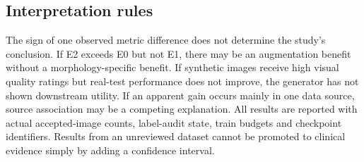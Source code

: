 \subsection{Interpretation rules}
The sign of one observed metric difference does not determine the study's conclusion. If E2 exceeds E0 but not E1, there may be an augmentation benefit without a morphology-specific benefit. If synthetic images receive high visual quality ratings but real-test performance does not improve, the generator has not shown downstream utility. If an apparent gain occurs mainly in one data source, source association may be a competing explanation. All results are reported with actual accepted-image counts, label-audit state, train budgets and checkpoint identifiers. Results from an unreviewed dataset cannot be promoted to clinical evidence simply by adding a confidence interval.
